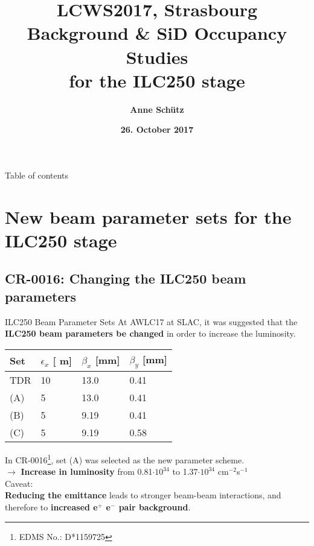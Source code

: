 \documentclass[xcolor={dvipsnames}]{beamer}
\title[ILC250 backgrounds \& SiD Occupancy]{\textbf{\alert{LCWS2017, Strasbourg} \\ \vspace*{0.5cm}  Background \& SiD Occupancy Studies\\for the ILC250 stage}}
\author{\textbf{Anne Sch\"utz}}
\institute{\textbf{DESY}}
\date{\textbf{26. October 2017}}
\newcommand{\electron}{e$^-$\xspace}
\newcommand{\positron}{e$^+$\xspace}
\newcommand{\murm}{%
  \ifmmode
    \mathchoice
        {\hbox{\normalsize\textmu}}
        {\hbox{\normalsize\textmu}}
        {\hbox{\scriptsize\textmu}}
        {\hbox{\tiny\textmu}}%
  \else
    \textmu
  \fi
}
\begin{document}
{
\begin{frame}
  \titlepage
\end{frame}
}
\setcounter{tocdepth}{2}
\begin{frame}{Table of contents}
  \tableofcontents
\end{frame}


\section{New beam parameter sets for the ILC250 stage}
\subsection{CR-0016: Changing the ILC250 beam parameters}
\begin{frame}{ILC250 Beam Parameter Sets}
At AWLC17 at SLAC, it was suggested that the \textbf{ILC250 beam parameters be changed} in order to increase the luminosity.~\cite{AWLC_Yokoya}
 \begin{table}
\label{tab:Parameters}
\centering
\begin{tabularx}{0.55\textwidth}{llll}
\hline\hline
\textbf{Set}  & \textbf{$\epsilon_x$ [\murm m]} & \textbf{$\beta_x$ [mm]} & \textbf{$\beta_y$ [mm]}\\
\hline
\cline{1-4}
\hline
 TDR & 10 & 13.0 & 0.41\\
 \alert{(A)} & 5 & 13.0 & 0.41\\
 (B) & 5 & 9.19 & 0.41\\
 (C) & 5 & 9.19 & 0.58\\
\hline\hline
\end{tabularx}
\end{table}
In CR-0016\footnote{EDMS No.: D*1159725}, set (A) was selected as the new parameter scheme.\\
$\rightarrow$ \textbf{Increase in luminosity} from 0.81$\cdot 10^{34}$ to 1.37$\cdot 10^{34}$ cm$^{-2}$s$^{-1}$\\
\alert{Caveat:\\
\textbf{Reducing the emittance} leads to stronger beam-beam interactions, and therefore to \textbf{increased \positron \electron pair background}.}
\end{frame}
\end{document}
